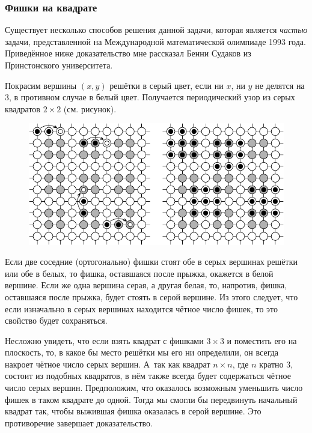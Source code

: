 \documentclass[twoside]{book}
\begin{document}
\subsubsection*{Фишки на квадрате}%

Существует несколько способов решения данной задачи, которая является \emph{частью} задачи, представленной на Международной математической олимпиаде 1993 года.
Приведённое ниже доказательство мне рассказал Бенни Судаков из Принстонского университета.


Покрасим вершины $(x, y)$ решётки в серый цвет, если ни $x$, ни $y$ не делятся на $3$, в противном случае в белый цвет.
Получается периодический узор из серых квадратов $2\times 2$ (см. рисунок). 

\begin{figure}[b]
  \vspace{-\baselineskip}
\centering
\includegraphics{mp/wink-190}
\end{figure}


Если две соседние (ортогонально) фишки стоят обе в серых вершинах решётки или обе в белых, то фишка, оставшаяся после прыжка, окажется в белой вершине.
Если же одна вершина серая, а другая белая, то, напротив, фишка, оставшаяся после прыжка, будет стоять в серой вершине.
Из этого следует, что если изначально в серых вершинах находится чётное число фишек, то это свойство будет сохраняться.

Несложно увидеть, что если взять квадрат с фишками $3\times 3$ и поместить его на плоскость, то, в какое бы место решётки мы его ни определили, он всегда накроет чётное число серых вершин.
А~так как квадрат $n\times n$, где $n$ кратно $3$, состоит из подобных квадратов,  в нём также всегда будет содержаться чётное число серых вершин.
Предположим, что оказалось возможным уменьшить число фишек в таком квадрате до одной.
Тогда мы смогли бы передвинуть начальный квадрат так, чтобы выжившая фишка оказалась в серой вершине. 
Это противоречие завершает доказательство.
\heart
\end{document}
